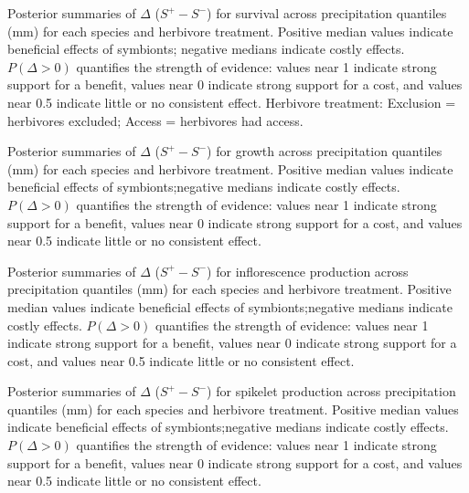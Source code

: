 \documentclass[12pt]{article}\usepackage[]{graphicx}\usepackage[dvipsnames]{xcolor}
\begin{document}
{\begin{table}[ht]
    \centering
    \caption{Posterior summaries of $\Delta$ ($S^{+} - S^{-}$) for survival
    across precipitation quantiles (mm) for each species and herbivore treatment.
    Positive median values indicate beneficial effects of symbionts; negative medians indicate costly effects.
    $P(\Delta>0)$ quantifies the strength of evidence: values near 1 indicate strong support for a benefit, values near 0 indicate strong support for a cost, and values near 0.5 indicate little or no consistent effect.
    Herbivore treatment: Exclusion = herbivores excluded; Access = herbivores had access.}
    \label{tab:delta_summary_surv_quantiles}
    
\end{table}
\clearpage

\begin{table}[ht]
    \centering
    \caption{Posterior summaries of $\Delta$ ($S^{+} - S^{-}$) for growth across precipitation quantiles (mm) for each species and herbivore treatment.
    Positive median values indicate beneficial effects of symbionts;negative medians indicate costly effects. 
    $P(\Delta>0)$ quantifies the strength of evidence: values near 1 indicate
    strong support for a benefit, values near 0 indicate strong support for a cost, and values near 0.5 indicate little or no consistent effect.}
    \label{tab:delta_summary_grow}
    
\end{table}
\clearpage

\begin{table}[ht]
    \centering
    \caption{Posterior summaries of $\Delta$ ($S^{+} - S^{-}$) for inflorescence production across precipitation quantiles (mm) for each species and herbivore treatment.
    Positive median values indicate beneficial effects of symbionts;negative medians indicate costly effects.
    $P(\Delta>0)$ quantifies the strength of evidence: values near 1 indicate strong support for a benefit, values near 0 indicate strong support for a cost, and values near 0.5 indicate little or no consistent effect.}
    \label{tab:delta_summary_flow}
    
\end{table}
\clearpage

\begin{table}[ht]
    \centering
    \caption{Posterior summaries of $\Delta$ ($S^{+} - S^{-}$) for spikelet production across precipitation quantiles (mm) for each species and herbivore treatment.
    Positive median values indicate beneficial effects of symbionts;negative medians indicate costly effects.
    $P(\Delta>0)$ quantifies the strength of evidence: values near 1 indicate strong support for a benefit, values near 0 indicate strong support for a cost, and values near 0.5 indicate little or no consistent effect.}
    \label{tab:delta_summary_spike}
    
\end{table}
\clearpage

}
\end{document}
